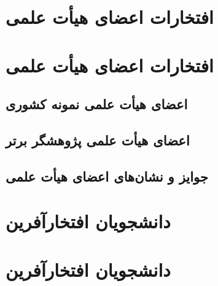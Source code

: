 \documentclass[
  letterpaper,
  DIV=11,
  numbers=noendperiod]{scrreprt}
\begin{document}

\chapter{افتخارات اعضای هیأت
علمی}\label{ux627ux641ux62aux62eux627ux631ux627ux62a-ux627ux639ux636ux627ux6cc-ux647ux6ccux623ux62a-ux639ux644ux645ux6cc}


\chapter{افتخارات اعضای هیأت
علمی}\label{ux627ux641ux62aux62eux627ux631ux627ux62a-ux627ux639ux636ux627ux6cc-ux647ux6ccux623ux62a-ux639ux644ux645ux6cc-1}

\section{اعضای هیأت علمی نمونه
کشوری}\label{ux627ux639ux636ux627ux6cc-ux647ux6ccux623ux62a-ux639ux644ux645ux6cc-ux646ux645ux648ux646ux647-ux6a9ux634ux648ux631ux6cc}

\section{اعضای هیأت علمی پژوهشگر
برتر}\label{ux627ux639ux636ux627ux6cc-ux647ux6ccux623ux62a-ux639ux644ux645ux6cc-ux67eux698ux648ux647ux634ux6afux631-ux628ux631ux62aux631}

\section{جوایز و نشان‌های اعضای هیأت
علمی}\label{ux62cux648ux627ux6ccux632-ux648-ux646ux634ux627ux646ux647ux627ux6cc-ux627ux639ux636ux627ux6cc-ux647ux6ccux623ux62a-ux639ux644ux645ux6cc}


\chapter{دانشجویان
افتخارآفرین}\label{ux62fux627ux646ux634ux62cux648ux6ccux627ux646-ux627ux641ux62aux62eux627ux631ux622ux641ux631ux6ccux646}


\chapter{دانشجویان
افتخارآفرین}\label{ux62fux627ux646ux634ux62cux648ux6ccux627ux646-ux627ux641ux62aux62eux627ux631ux622ux641ux631ux6ccux646-1}
\end{document}
